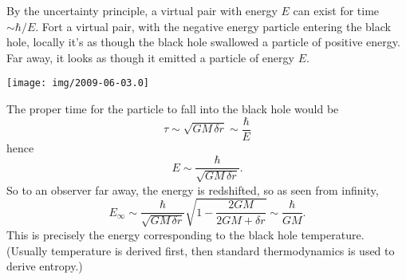By the uncertainty principle, a virtual pair with energy $E$ can exist
for time $\sim \hbar/E$. Fort a virtual pair, with the negative energy
particle entering the black hole, locally it's as though the black hole
swallowed a particle of positive energy. Far away, it looks as though it
emitted a particle of energy $E$.
\begin{center}
  \texttt{[image: img/2009-06-03.0]}
\end{center}
The proper time for the particle to fall into the black hole would be
\begin{equation}
\tau\sim\sqrt{GM\,\delta r}\sim\frac{\hbar}{E}
\end{equation}
hence
\begin{equation}
E\sim\frac{\hbar}{\sqrt{GM\,\delta r}}.
\end{equation}
So to an observer far away, the energy is redshifted, so as seen from
infinity,
\begin{equation}
E_{\infty}\sim\frac{\hbar}{\sqrt{GM\,\delta r}}\sqrt{1 -
  \frac{2GM}{2GM+\delta r}}\sim\frac{\hbar}{GM}.
\end{equation}
This is precisely the energy corresponding to the black hole temperature.
(Usually temperature is derived first, then standard thermodynamics is
used to derive entropy.)

